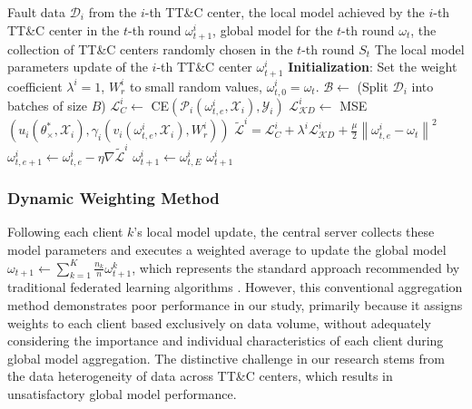 \begin{algorithm}[t]
	\caption{Heritage Distillation Method}
	\label{Alg:Heritage Distillation Method}
	\begin{algorithmic}[1]
		\REQUIRE Fault data ${{\mathscr D}_{i}}$ from the $i$-th TT\&C center, the local model achieved by the $i$-th TT\&C center in the $t$-th round $\omega _{t + 1}^i$, global model for the $t$-th round ${\omega _t}$, the collection of TT\&C centers randomly chosen in the $t$-th round ${S_t}$
		\ENSURE The local model parameters update of the $i$-th TT\&C center $\omega _{t + 1}^i$
		\STATE \textbf{Initialization}: Set the weight coefficient ${\lambda ^i} = 1$, $W_r^i$ to small random values, $\omega _{t,0}^i = {\omega _t}$.
		\STATE $\mathcal B \leftarrow $ (Split ${{\mathscr D}_{i}}$ into batches of size $B$)
		\STATE $\mathcal  L_C^i \leftarrow$ CE$\left( {{\mathcal P_i}\left( {\omega _{t,e}^i,{\mathcal X_i}} \right),{\mathcal Y_i}} \right)$
		\STATE ${\mathcal L_{\mathcal KD}^i} \leftarrow$ MSE$\left( {{u_i}\left( {\theta _ \times ^ * ,{\mathcal X_i}} \right),{\gamma _i}\left( {{v_i}\left( {\omega _{t,e}^i,{\mathcal X_i}} \right),W_r^i} \right)} \right)$
		\STATE ${ {\tilde { \mathcal L}^i}} = \mathcal L_C^i + {\lambda ^i} {\mathcal L_{\mathcal KD}^i} + \frac{\mu }{2}{\left\| {\omega _{t,e}^i - {\omega _t}} \right\|^2}$
		\STATE $\omega _{t,e + 1}^i \leftarrow \omega _{t,e}^i - {\eta}\nabla  {\tilde {\mathcal L}^i}$
		\ENDFOR
		\ENDFOR
		\STATE $\omega _{t + 1}^i \leftarrow \omega _{t,E}^i$
		\RETURN $\omega _{t + 1}^i$
	\end{algorithmic}
\end{algorithm}

\subsubsection{Dynamic Weighting Method}
\label{section:3-2-2}
Following each client $k$'s local model update, 
the central server collects these model parameters and 
executes a weighted average to update the global model ${\omega _{t + 1}} \leftarrow \sum\nolimits_{k = 1}^K {\frac{{{n_k}}}{n}\omega _{t + 1}^k} $, 
which represents the standard approach recommended by traditional federated learning algorithms \cite{von2018data}. 
However, this conventional aggregation method demonstrates poor performance in our study, 
primarily because it assigns weights to each client based exclusively on data volume, 
without adequately considering the importance and individual characteristics of each client during global model aggregation. 
The distinctive challenge in our research stems from the data heterogeneity of data across TT\&C centers, 
which results in unsatisfactory global model performance.

